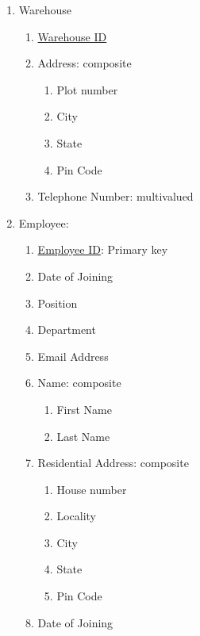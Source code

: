 \documentclass[12pt]{report}
\begin{document}
\begin{enumerate}
\begin{enumerate}
            \end{enumerate}
        \item Warehouse
            \begin{enumerate}
                \item \underline{Warehouse ID}
                \item Address: composite
                    \begin{enumerate}
                        \item Plot number
                        \item City
                        \item State
                        \item Pin Code
                    \end{enumerate}
                \item Telephone Number: multivalued
            \end{enumerate}
        \item Employee:
            \begin{enumerate}
                \item \underline{Employee ID}: Primary key
                \item Date of Joining
                \item Position
                \item Department
                \item Email Address
                \item Name: composite
                    \begin{enumerate}
                        \item First Name
                        \item Last Name
                    \end{enumerate}
                \item Residential Address: composite
                    \begin{enumerate}
                        \item House number
                        \item Locality
                        \item City
                        \item State
                        \item Pin Code
                    \end{enumerate}
                \item Date of Joining

\end{enumerate}
\end{enumerate}
\end{document}
